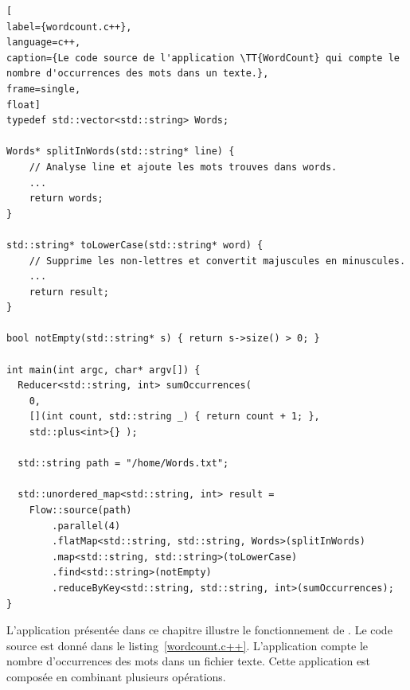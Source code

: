 \begin{lstlisting}[
label={wordcount.c++},
language=c++,
caption={Le code source de l'application \TT{WordCount} qui compte le nombre d'occurrences des mots dans un texte.},
frame=single,
float]
typedef std::vector<std::string> Words;

Words* splitInWords(std::string* line) {
    // Analyse line et ajoute les mots trouves dans words.
    ...
    return words;
}

std::string* toLowerCase(std::string* word) {
    // Supprime les non-lettres et convertit majuscules en minuscules.
    ...
    return result;
}

bool notEmpty(std::string* s) { return s->size() > 0; }

int main(int argc, char* argv[]) {
  Reducer<std::string, int> sumOccurrences(
    0, 
    [](int count, std::string _) { return count + 1; },
    std::plus<int>{} );

  std::string path = "/home/Words.txt"; 

  std::unordered_map<std::string, int> result = 
    Flow::source(path) 
        .parallel(4)
        .flatMap<std::string, std::string, Words>(splitInWords)
        .map<std::string, std::string>(toLowerCase)
        .find<std::string>(notEmpty)
        .reduceByKey<std::string, std::string, int>(sumOccurrences);
}
\end{lstlisting}


L'application  pr\'esent\'ee dans ce chapitre illustre le fonctionnement de . Le code source est donn\'e dans le listing~\ref{wordcount.c++}. L'application compte le nombre d'occurrences des mots dans un fichier texte. Cette application est compos\'ee en combinant plusieurs op\'erations.



